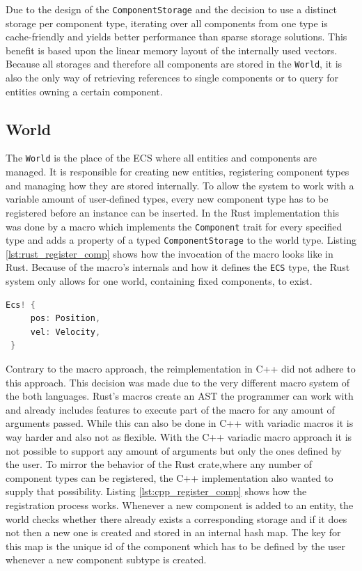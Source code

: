 \noindent
Due to the design of the \texttt{ComponentStorage} and the decision to use a distinct storage per component type, iterating over all components from one type is cache-friendly and yields better performance than sparse storage solutions. This benefit is based upon the linear memory layout of the internally used vectors. Because all storages and therefore all components are stored in the \texttt{World}, it is also the only way of retrieving references to single components or to query for entities owning a certain component. 

\subsection{World}
 
 The \texttt{World} is the place of the \ac{ECS} where all entities and components are managed. It is responsible for creating new entities, registering component types and managing how they are stored internally. To allow the system to work with a variable amount of user-defined types, every new component type has to be registered before an instance can be inserted. In the Rust implementation this was done by a macro which implements the \texttt{Component} trait for every specified type and adds a property of a typed \texttt{ComponentStorage} to the world type. Listing \ref{lst:rust_register_comp} shows how the invocation of the macro looks like in Rust. Because of the macro's internals and how it defines the \texttt{ECS} type, the Rust system only allows for one world, containing fixed components, to exist.\\
 
 \begin{lstlisting}[caption={Registering custom components with the Rust ECS}, label={lst:rust_register_comp}, language={C++}]
 Ecs! {
	 pos: Position,
	 vel: Velocity,
 }
 \end{lstlisting}
 
 \noindent
 Contrary to the macro approach, the reimplementation in C++ did not adhere to this approach. This decision was made due to the very different macro system of the both languages. Rust's macros create an \ac{AST} the programmer can work with and already includes features to execute part of the macro for any amount of arguments passed. While this can also be done in C++ with variadic macros it is way harder and also not as flexible. With the C++ variadic macro approach it is not possible to support any amount of arguments but only the ones defined by the user. To mirror the behavior of the Rust crate,where any number of component types can be registered, the C++ implementation also wanted to supply that possibility. Listing \ref{lst:cpp_register_comp} shows how the registration process works. Whenever a new component is added to an entity, the world checks whether there already exists a corresponding storage and if it does not then a new one is created and stored in an internal hash map. The key for this map is the unique id of the component which has to be defined by the user whenever a new component subtype is created.\\
 
